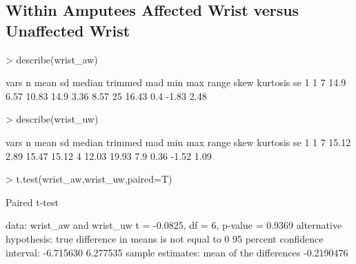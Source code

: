 \documentclass{article}
\begin{document}
\subsection*{Within Amputees Affected Wrist versus Unaffected Wrist}
\begin{Schunk}
\begin{Sinput}
> describe(wrist_aw)
\end{Sinput}
\begin{Soutput}
  vars n mean   sd median trimmed  mad  min max range skew kurtosis   se
1    1 7 14.9 6.57  10.83    14.9 3.36 8.57  25 16.43  0.4    -1.83 2.48
\end{Soutput}
\begin{Sinput}
> describe(wrist_uw)
\end{Sinput}
\begin{Soutput}
  vars n  mean   sd median trimmed mad   min   max range skew kurtosis   se
1    1 7 15.12 2.89  15.47   15.12   4 12.03 19.93   7.9 0.36    -1.52 1.09
\end{Soutput}
\begin{Sinput}
> t.test(wrist_aw,wrist_uw,paired=T)
\end{Sinput}
\begin{Soutput}
	Paired t-test

data:  wrist_aw and wrist_uw
t = -0.0825, df = 6, p-value = 0.9369
alternative hypothesis: true difference in means is not equal to 0
95 percent confidence interval:
 -6.715630  6.277535
sample estimates:
mean of the differences 
             -0.2190476 
\end{Soutput}
\end{Schunk}
\end{document}
